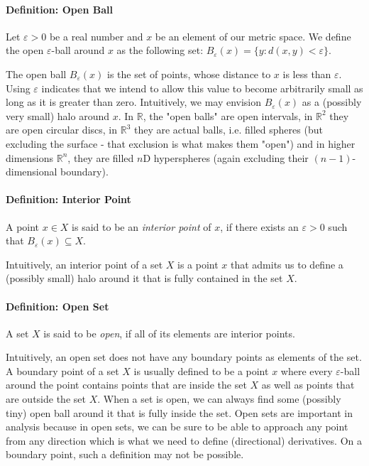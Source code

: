 
\paragraph{Definition: Open Ball} Let $\varepsilon > 0$ be a real number and $x$ be an element of our metric space.  We define the open $\varepsilon$-ball around $x$ as the following set: $B_\varepsilon(x) = \{ y : d(x,y) < \varepsilon \}$.

\medskip
The open ball $B_\varepsilon(x)$ is the set of points, whose distance to $x$ is less than $\varepsilon$. Using $\varepsilon$ indicates that we intend to allow this value to become arbitrarily small as long as it is greater than zero. Intuitively, we may envision $B_\varepsilon(x)$ as a (possibly very small) halo around $x$. In $\mathbb{R}$, the "open balls" are open intervals, in $\mathbb{R}^2$ they are open circular discs, in $\mathbb{R}^3$ they are actual balls, i.e. filled spheres (but excluding the surface - that exclusion is what makes them "open") and in higher dimensions $\mathbb{R}^n$, they are filled $n$D hyperspheres (again excluding their $(n-1)$-dimensional boundary).

\paragraph{Definition: Interior Point} A point $x \in X$ is said to be an \emph{interior point} of $x$, if there exists an $\varepsilon > 0$ such that $B_\varepsilon(x) \subseteq X$. 


\medskip
Intuitively, an interior point of a set $X$ is a point $x$ that admits us to define a (possibly small) halo around it that is fully contained in the set $X$.

\paragraph{Definition: Open Set} A set $X$ is said to be \emph{open}, if all of its elements are interior points. 

\medskip
Intuitively, an open set does not have any boundary points as elements of the set. A boundary point of a set $X$ is usually defined to be a point $x$ where every $\varepsilon$-ball around the point contains points that are inside the set $X$ as well as points that are outside the set $X$. When a set is open, we can always find some (possibly tiny) open ball around it that is fully inside the set. Open sets are important in analysis because in open sets, we can be sure to be able to approach any point from any direction which is what we need to define (directional) derivatives. On a boundary point, such a definition may not be possible.

